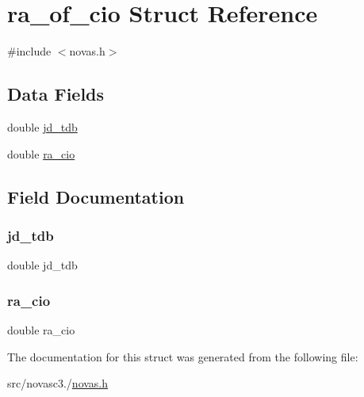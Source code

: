 \hypertarget{structra__of__cio}{}\section{ra\+\_\+of\+\_\+cio Struct Reference}
\label{structra__of__cio}


{\ttfamily \#include $<$novas.\+h$>$}

\subsection*{Data Fields}
\begin{DoxyCompactItemize}
\item 
double \mbox{\hyperlink{structra__of__cio_a0aefc536698706b7f8a15f23168c3486}{jd\+\_\+tdb}}
\item 
double \mbox{\hyperlink{structra__of__cio_aba4253d16ca8c644b29da1e727d787aa}{ra\+\_\+cio}}
\end{DoxyCompactItemize}


\subsection{Field Documentation}
\mbox{\label{structra__of__cio_a0aefc536698706b7f8a15f23168c3486}} 
\subsubsection{\texorpdfstring{jd\+\_\+tdb}{jd\_tdb}}
{\footnotesize\ttfamily double jd\+\_\+tdb}

\mbox{\label{structra__of__cio_aba4253d16ca8c644b29da1e727d787aa}} 
\subsubsection{\texorpdfstring{ra\+\_\+cio}{ra\_cio}}
{\footnotesize\ttfamily double ra\+\_\+cio}



The documentation for this struct was generated from the following file\+:\begin{DoxyCompactItemize}
\item 
src/novasc3./\mbox{\hyperlink{novas_8h}{novas.\+h}}\end{DoxyCompactItemize}
